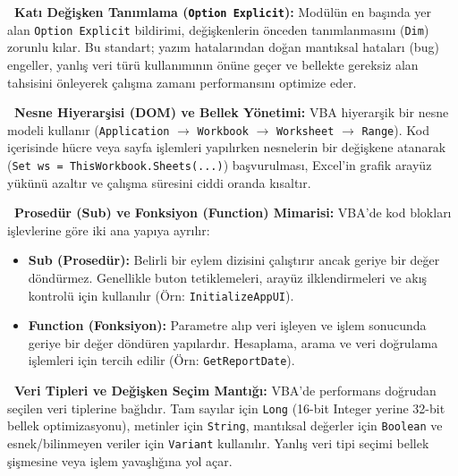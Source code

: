 \begin{tcolorbox}[colback=lightgray,colframe=bordergray,leftrule=3.5pt,boxrule=0.4pt,top=5pt,bottom=5pt]
    \textbf{\textcolor{primary}{\faShield*\ Katı Değişken Tanımlama (\texttt{Option Explicit}):}}
    Modülün en başında yer alan \texttt{Option Explicit} bildirimi, değişkenlerin önceden tanımlanmasını (\texttt{Dim}) zorunlu kılar. Bu standart; yazım hatalarından doğan mantıksal hataları (bug) engeller, yanlış veri türü kullanımının önüne geçer ve bellekte gereksiz alan tahsisini önleyerek çalışma zamanı performansını optimize eder.
\end{tcolorbox}

\begin{tcolorbox}[colback=lightgray,colframe=bordergray,leftrule=3.5pt,boxrule=0.4pt,top=5pt,bottom=5pt]
    \textbf{\textcolor{primary}{\faCube\ Nesne Hiyerarşisi (DOM) ve Bellek Yönetimi:}}
    VBA hiyerarşik bir nesne modeli kullanır (\texttt{Application} $\rightarrow$ \texttt{Workbook} $\rightarrow$ \texttt{Worksheet} $\rightarrow$ \texttt{Range}). Kod içerisinde hücre veya sayfa işlemleri yapılırken nesnelerin bir değişkene atanarak (\texttt{Set ws = ThisWorkbook.Sheets(...)}) başvurulması, Excel'in grafik arayüz yükünü azaltır ve çalışma süresini ciddi oranda kısaltır.
\end{tcolorbox}

\begin{tcolorbox}[colback=lightgray,colframe=bordergray,leftrule=3.5pt,boxrule=0.4pt,top=5pt,bottom=5pt]
    \textbf{\textcolor{primary}{\faCodeBranch\ Prosedür (Sub) ve Fonksiyon (Function) Mimarisi:}}
    VBA'de kod blokları işlevlerine göre iki ana yapıya ayrılır:
    \begin{itemize}
        \item \textbf{Sub (Prosedür):} Belirli bir eylem dizisini çalıştırır ancak geriye bir değer döndürmez. Genellikle buton tetiklemeleri, arayüz ilklendirmeleri ve akış kontrolü için kullanılır (Örn: \texttt{InitializeAppUI}).
        \item \textbf{Function (Fonksiyon):} Parametre alıp veri işleyen ve işlem sonucunda geriye bir değer döndüren yapılardır. Hesaplama, arama ve veri doğrulama işlemleri için tercih edilir (Örn: \texttt{GetReportDate}).
    \end{itemize}
\end{tcolorbox}

\begin{tcolorbox}[colback=lightgray,colframe=bordergray,leftrule=3.5pt,boxrule=0.4pt,top=5pt,bottom=5pt]
    \textbf{\textcolor{primary}{\faDatabase\ Veri Tipleri ve Değişken Seçim Mantığı:}}
    VBA'de performans doğrudan seçilen veri tiplerine bağlıdır. Tam sayılar için \texttt{Long} (16-bit Integer yerine 32-bit bellek optimizasyonu), metinler için \texttt{String}, mantıksal değerler için \texttt{Boolean} ve esnek/bilinmeyen veriler için \texttt{Variant} kullanılır. Yanlış veri tipi seçimi bellek şişmesine veya işlem yavaşlığına yol açar.
\end{tcolorbox}

